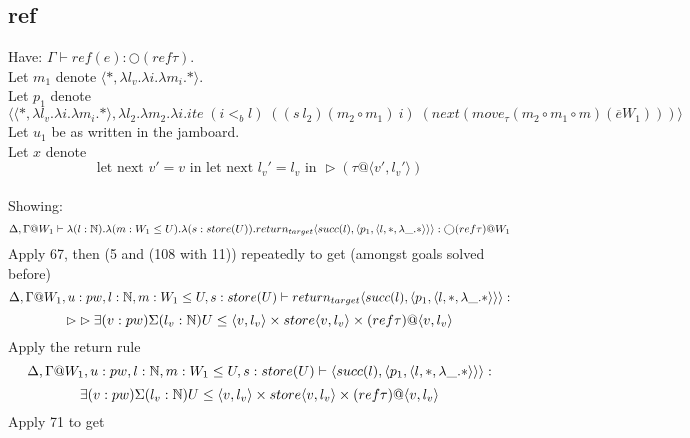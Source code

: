 \message{ !name(paper.tex)}\documentclass{article}
\begin{document}

%

\subsection{ref}
Have: $\Gamma \vdash ref(e) : \bigcirc(ref \tau )$. \\
Let $m_1$ denote $ \langle *, \lambda l_v. \lambda i. \lambda m_i. * \rangle$.\\
Let $p_1$ denote
\[\langle \langle *, \lambda l_v. \lambda i. \lambda m_i. * \rangle , \lambda l_2. \lambda m_2. \lambda i. ite \; (i <_b l) \;
((s \: l_2) (m_2 \circ m_1)\: i) \; (next
(move_{\tau}(m_2 \circ m_1 \circ m) 
(\overline{e} W_1)))
\rangle\]
Let $u_1$ be as written in the jamboard.\\
Let $x$ denote \[\text{let next }v' = v \text{ in let next } l_v' = l_v \text{ in } \rhd(\tau @ \langle v', l_v' \rangle)\]
\\
Showing: \[\Delta, \Gamma@W_1 \vdash \lambda (l : \N). \lambda (m: W_1 \leq U). \lambda (s: store(U)).return_{target} \langle succ(l), \langle p_1, \langle l, *, \lambda \_. *
\rangle \rangle \rangle : \bigcirc (ref \tau ) @ W_1\]
Apply 67, then (5 and (108 with 11)) repeatedly to get (amongst goals solved before)
\[\Delta, \Gamma@W_1, u: pw, l: \N, m: W_1 \leq U, s: store(U) \vdash return_{target} \langle succ(l), \langle p_1, \langle l, *, \lambda \_. *
\rangle \rangle \rangle :\] 
\[\rhd \rhd \exists(v: pw)\Sigma(l_v: \mathbb{N}) U \leq \langle v, l_v \rangle \times store\langle v, l_v \rangle \times (ref \tau)@\langle v, l_v \rangle
\]
Apply the return rule 
\[\Delta, \Gamma@W_1, u: pw, l: \N, m: W_1 \leq U, s: store(U) \vdash  \langle succ(l), \langle p_1, \langle l, *, \lambda \_. *
\rangle \rangle \rangle :\] \[\exists(v: pw)\Sigma(l_v: \mathbb{N}) U \leq \langle v, l_v \rangle \times store\langle v, l_v \rangle \times (ref \tau)@\langle v, l_v \rangle\] 
Apply 71 to get
\end{document}
